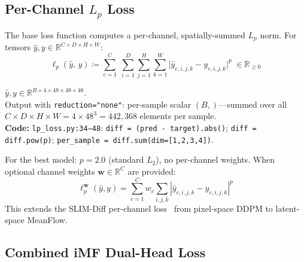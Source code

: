\documentclass[11pt,a4paper]{article}
\newcommand{\code}[1]{\texttt{#1}}
\begin{document}
\subsection{Per-Channel \texorpdfstring{$L_p$}{Lp} Loss}
\label{sec:lp_loss}

The base loss function computes a per-channel, spatially-summed $L_p$ norm.
For tensors $\hat{y}, y \in \mathbb{R}^{C \times D \times H \times W}$:
\begin{equation}
  \ell_p(\hat{y},\,y)
    \coloneqq \sum_{c=1}^{C}\;\sum_{i=1}^{D}\sum_{j=1}^{H}\sum_{k=1}^{W}
      \bigl|\hat{y}_{c,i,j,k} - y_{c,i,j,k}\bigr|^p
    \;\in \mathbb{R}_{\ge 0}
  \label{eq:lp_loss}
\end{equation}
\begin{shapes}
$\hat{y}, y \in \mathbb{R}^{B \times 4 \times 48 \times 48 \times 48}$.\\
Output with \code{reduction="none"}: per-sample scalar $(B,)$---summed over all
$C \times D \times H \times W = 4 \times 48^3 = 442{,}368$ elements per sample.\\
\textbf{Code:} \code{lp\_loss.py:34--48}:
\code{diff = (pred - target).abs()}; \code{diff = diff.pow(p)};
\code{per\_sample = diff.sum(dim=[1,2,3,4])}.
\end{shapes}

\noindent
For the best model: $p{=}2.0$ (standard $L_2$), no per-channel weights.
When optional channel weights $\mathbf{w} \in \mathbb{R}^C$ are provided:
\begin{equation}
  \ell_p^{\mathbf{w}}(\hat{y},y)
    = \sum_{c=1}^{C} w_c \!\sum_{i,j,k}
      |\hat{y}_{c,i,j,k} - y_{c,i,j,k}|^p
  \label{eq:lp_weighted}
\end{equation}
This extends the SLIM-Diff per-channel loss~\cite{slimdiff} from pixel-space
DDPM to latent-space MeanFlow.

\subsection{Combined iMF Dual-Head Loss}
\label{sec:dual_loss}
\end{document}
